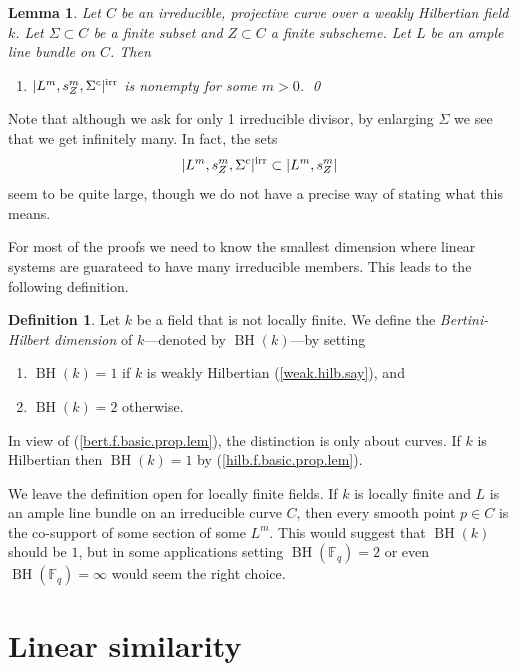 \documentclass{amsart}
\newtheorem{lem}[thm]{Lemma}
\theoremstyle{definition}
\newtheorem{defn}[thm]{Definition}
\theoremstyle{remark}
\newcommand{\f}[0]{{\mathbb F}}
\newcommand{\BH}[0]{\operatorname{BH}}
\begin{document}
\begin{lem}\label{w.hilb.f.basic.prop.lem}  Let $C$ be an irreducible,    projective curve over a weakly Hilbertian  field $k$. Let $\Sigma\subset C$ be a finite subset and $Z\subset C$ a finite subscheme. Let $L$ be an ample  line bundle on $C$. Then
\begin{enumerate}
\item $|L^m, s^m_Z, \Sigma^c|^{\rm irr}$ is nonempty for some $m>0$. \qed
\end{enumerate}
\end{lem}

Note that although we ask for only 1 irreducible divisor, by enlarging
$\Sigma$ we see that we get infinitely many. In fact, the sets
$$
|L^m, s^m_Z, \Sigma^c|^{\rm irr}\subset |L^m, s^m_Z|
$$
seem to be quite large, though we do not have a precise way of stating what this means.
\medskip

For most of the proofs we need to know the smallest dimension where linear systems  are guarateed to have many irreducible  members. This leads to the following definition.

\begin{defn}\label{ber-hil.dim.defn}
Let  $k$ be a field that is not locally finite.
 We define the  {\it Bertini-Hilbert dimension} of  $k$---denoted by $\BH(k)$---by setting   
\begin{enumerate}
\item   $\BH(k)=1$ if $k$ is weakly Hilbertian (\ref{weak.hilb.say}), and
\item   $\BH(k)=2$ otherwise.
\end{enumerate}
In view of (\ref{bert.f.basic.prop.lem}), the distinction is only about curves.
If $k$ is Hilbertian  then $\BH(k)=1$ by (\ref{hilb.f.basic.prop.lem}).





We leave the  definition open for locally finite fields. If $k$ is locally finite and $L$ is an ample line bundle on an irreducible curve
$C$, then every smooth point $p\in C$ is the co-support of some section of
some $L^m$.  This would suggest that $\BH(k)$ should be $1$, but in some applications setting $\BH(\f_q)=2$  or even $\BH(\f_q)=\infty$  would seem the right choice.
\end{defn}






\section{Linear similarity}\label{lin.sim.sec}
\end{document}
